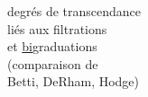 degrés de transcendance\\
liés aux filtrations\\
et \uline{bi}graduations\\
(comparaison de\\
Betti, DeRham, Hodge)

